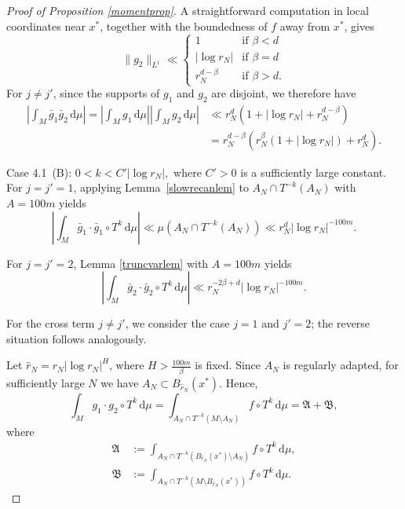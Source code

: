 \documentclass[10pt,a4paper]{amsart}
\renewcommand{\d}{\, \text{d}}
\begin{document}
\begin{proof}[Proof of Proposition \ref{momentprop}]
A straightforward computation in local coordinates near $x^*$, together with the boundedness of $f$ away from $x^*$, gives
\begin{equation*}
\|g_2\|_{L^1}\ll \begin{cases}
1 & \text{if } \beta<d\\
|\log r_N| & \text{if } \beta=d\\
r_N^{d-\beta} & \text{if } \beta>d.
\end{cases}
\end{equation*}
For $j\neq j'$, since the supports of $g_1$ and $g_2$ are disjoint, we therefore have
\begin{align*}
\left|\int_M \bar g_1\bar g_2\d\mu\right|=\left|\int_M g_1\d\mu\right|\left|\int_M g_2\d\mu\right|
&\ll r_N^{d}\left(1+|\log r_N|+r_N^{d-\beta}\right)\\
&=r_N^{d-\beta} \left(r_N^{\beta}(1+|\log r_N|) + r_N^d\right).
\end{align*}






Case 4.1~(B): $0<k<C' \left|\log r_N \right|,$ where $C'>0$ is a sufficiently large constant. For $j=j'=1$, applying Lemma~\ref{slowrecanlem} to $A_N \cap T^{-k}(A_N)$ with $A=100m$ yields
\begin{equation*}
\left|\int_M \bar{g}_1 \cdot \bar{g}_1 \circ T^{k} \d\mu\right|\ll \mu\left(A_N \cap T^{-k}(A_N)\right)
\ll r_N^d \left|\log r_N \right|^{-100m}.
\end{equation*}

For $j=j'=2$, Lemma \ref{truncvarlem} with $A=100m$ yields
\begin{equation}
\left| \int_M \bar{g}_2 \cdot \bar{g}_2 \circ T^k \d\mu \right| \ll r_N^{-2\beta+d} |\log r_N|^{-100m}.
\end{equation}

For the cross term $j\neq j'$, we consider the case $j=1$ and $j'=2$;
the reverse situation follows analogously.

Let $\hat{r}_N=r_N|\log r_N|^H$, where $H>\frac{100m}{\beta}$ is fixed. Since $A_N$ is regularly adapted, for sufficiently large $N$ we have $A_N\subset B_{\hat{r}_N}(x^*)$. Hence,
\begin{equation*}
\int_M g_1\cdot g_2\circ T^k\d\mu
=
\int_{A_N\cap T^{-k}(M\setminus A_N)}f\circ T^k\d\mu
=
\mathfrak A+\mathfrak B,
\end{equation*}
where
\begin{align*}
\mathfrak A&:=
\int_{A_N\cap T^{-k}(B_{\hat{r}_N}(x^*)\setminus A_N)}
f\circ T^k\d\mu,\\
\mathfrak B&:=
\int_{A_N\cap T^{-k}(M\setminus B_{\hat{r}_N}(x^*))}
f\circ T^k\d\mu .
\end{align*}


\end{proof}
\end{document}
